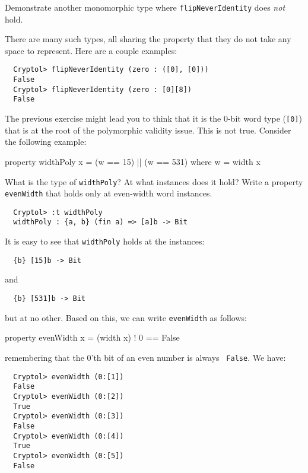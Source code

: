 \begin{Exercise}\label{ex:polythm:1}
  Demonstrate another monomorphic type where {\tt flipNeverIdentity}
  does \emph{not} hold.
\end{Exercise}
\begin{Answer}
  There are many such types, all sharing the property that they do not
  take any space to represent. Here are a couple examples:\indZero
\begin{Verbatim}
  Cryptol> flipNeverIdentity (zero : ([0], [0]))
  False
  Cryptol> flipNeverIdentity (zero : [0][8])
  False
\end{Verbatim}
\end{Answer}


\begin{Exercise}\label{ex:polythm:2}
  The previous exercise might lead you to think that it is the 0-bit
  word type ({\tt [0]}) that is at the root of the polymorphic
  validity issue.  This is not true. Consider the following
  example:\indWidth\indThmPolyvalid
\begin{code}
  property widthPoly x = (w == 15) || (w == 531)
     where w = width x
\end{code}
What is the type of {\tt widthPoly}? At what instances does it hold?
Write a property {\tt evenWidth} that holds only at even-width word
instances.
\end{Exercise}
\begin{Answer}
\begin{Verbatim}
  Cryptol> :t widthPoly
  widthPoly : {a, b} (fin a) => [a]b -> Bit
\end{Verbatim}
It is easy to see that {\tt widthPoly} holds at the instances:
\begin{Verbatim}
  {b} [15]b -> Bit
\end{Verbatim}
and
\begin{Verbatim}
  {b} [531]b -> Bit
\end{Verbatim}
but at no other. Based on this, we can write {\tt evenWidth} as
follows:\indWidth
\begin{code}
  property evenWidth x = (width x) ! 0 == False
\end{code}
remembering that the 0'th bit of an even number is always {\tt
  False}. We have:
\begin{Verbatim}
  Cryptol> evenWidth (0:[1])
  False
  Cryptol> evenWidth (0:[2])
  True
  Cryptol> evenWidth (0:[3])
  False
  Cryptol> evenWidth (0:[4])
  True
  Cryptol> evenWidth (0:[5])
  False
\end{Verbatim}
\end{Answer}

